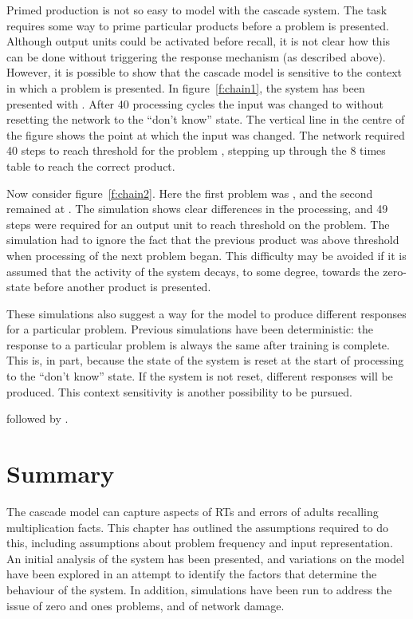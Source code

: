 Primed production is not so easy to model with the cascade system. The task
requires some way to prime particular products before a problem is
presented.  Although output units could be activated before recall, it is
not clear how this can be done without triggering the response mechanism
(as described above). However, it is possible to show that the cascade
model is sensitive to the context in which a problem is presented.  In
figure~\ref{f:chain1}, the system has been presented with .  After 40
processing cycles the input was changed to  without resetting the
network to the ``don't know'' state. The vertical line in the centre of the
figure shows the point at which the input was changed.  The network
required 40 steps to reach threshold for the problem , stepping up
through the 8 times table to reach the correct product.

Now consider figure~\ref{f:chain2}.  Here the first problem was , and
the second remained at .  The simulation shows clear differences in the
processing, and 49 steps were required for an output unit to reach
threshold on the  problem.  The simulation had to ignore the fact that
the previous product was above threshold when processing of the next
problem began.  This difficulty may be avoided if it is assumed that the
activity of the system decays, to some degree, towards the zero-state
before another product is presented.

These simulations also suggest a way for the model to produce different
responses for a particular problem. Previous simulations have been
deterministic:  the response to a particular problem is always the
same after training is complete.  This is, in part, because the state of
the system is reset at the start of processing to the ``don't know'' state.
If the system is not reset, different responses will
be produced.  This context sensitivity is another possibility to be
pursued.


\begin{fancyfigure}
\centerline{}
\caption{ followed by .}
\label{f:chain2}
\end{fancyfigure}



\section{Summary}

The cascade model can capture aspects of RTs and errors of adults recalling
multiplication facts.  This chapter has outlined the assumptions required
to do this, including assumptions about problem frequency and input
representation.  An initial analysis of the system has been presented, and
variations on the model have been explored in an attempt to identify the
factors that determine the behaviour of the system.  In addition,
simulations have been run to address the issue of zero and ones
problems, and of network damage.

